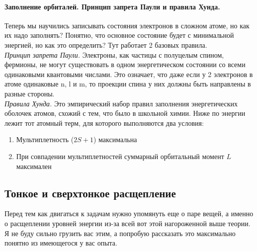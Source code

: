 \documentclass[12pt]{article}
\begin{document}
\paragraph{Заполнение орбиталей. Принцип запрета Паули и правила Хунда.}
Теперь мы научились записывать состояния электронов в сложном атоме, но как их надо заполнять? Понятно, что основное состояние будет с минимальной энергией, но как это определить? Тут работает 2 базовых правила. \\
\textit{Принцип запрета Паули.} Электроны, как частицы с полуцелым спином, фермионы, не могут существовать в одном энергетическом состоянии со всеми одинаковыми квантовыми числами. Это означает, что даже если у 2 электронов в атоме одинаковые n, l и m, то проекции спина у них должны быть направлены в разные стороны.\\
\textit{Правила Хунда.} Это эмпирический набор правил заполнения энергетических оболочек атомов, схожий с тем, что было в школьной химии. Ниже по энергии лежит тот атомный терм, для которого выполняются два условия:
\begin{enumerate}
    \item Мультиплетность ($2S+1$) максимальна
    \item При совпадении мультиплетностей суммарный орбитальный момент $L$ максимален
\end{enumerate}



\subsection{Тонкое и сверхтонкое расщепление}
Перед тем как двигаться к задачам нужно упомянуть еще о паре вещей, а именно о расщеплении уровней энергии из-за всей вот этой нагороженной выше теории. Я не буду сильно грузить вас этим, а попробую рассказать это максимально понятно из имеющегося у вас опыта. 
\end{document}
